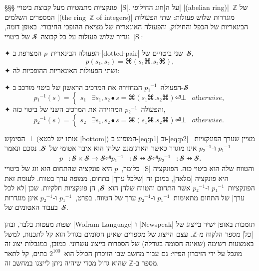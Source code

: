 §§§ פונקציות מתמטיות מעל קבוצת ביטויי~\E|S|.
על ה\ע|חוג החילופי| \E|(abelian ring)|~$ℤ$ של המספרים השלמים \E|(the ring~$ℤ$
of integers)| מוגדרות שלוש פעולות: שתי הפעולות הבינאריות של הכפל והחילוק,
והפעולה האונארית של מציאת ההופכי החיבורי. באופן דומה, נגדיר שלוש פעולות על כל
קבוצה~$𝓢$ של ביטויי~\E|S|:
\begin{enumerate}
  ✦ הפעולה הבינארית~$p$ המצרפת ב-\E|dotted-pair| שני ביטויים של~$𝓢$,
  \begin{equation}
    p(s₁,s₂)=⌘(s₁⌘.s₂⌘),
  \end{equation}
  ✦ ושתי הפעולות האונאריות ההופכיות לה:
  \begin{enumerate}
    ✦ הפעולה~$p₁^{-1}$ המחזירה את המרכיב
    הראשון של ביטוי מורכב ב-$𝓢$
    \begin{equation}\label{eq:p1}
      p₁^{-1}(s)=\begin{cases}
        s₁ & ∃ s₁, s₂ ∙ s=⌘(s₁⌘.s₂⌘) ⏎
        ⊥  & \textit{otherwise},
      \end{cases}
    \end{equation}
    ✦ והפעולה~$p₂^{-1}$ המחזירה את המרכיב השני של ביטוי כזה,
    \begin{equation}\label{eq:p2}
      p₂^{-1}(s)=\begin{cases}
        s₂ & ∃ s₁, s₂ ∙ s=⌘(s₁⌘.s₂⌘) ⏎
        ⊥  & \textit{otherwise}.
      \end{cases}
    \end{equation}
  \end{enumerate}
\end{enumerate}
הסימןש~$⊥$ (אותו יש לבטא \E|bottom|) המופיע ב-|eq:p1| וב-|eq:p2|
מציין שערך הפונקציות~$p₁^{-1}$ ו-$p₂^{-1}$ אינו מוגדר כאשר הארגומנט שלהן הוא
איבר אטומי של~$𝓢$. נסכם ונאמר
\begin{equation}
  \begin{split}
    p&:𝓢×𝓢→𝓢⏎
    p₁^{-1}&:𝓢 ⇸𝓢⏎
    p₂^{-1}&:𝓢 ⇸𝓢.
  \end{split}
\end{equation}
כלומר,~$p$ היא פונקציה שהתחום הוא זוג של ביטויי~\E|S| והטווח שלה הוא ביטוי כזה.
הפונקציה היא פונקציה \ע|מלאה|, במובן זה \ע|שלכל ערך| בתחום, ממופה ערך בטווח.
לעומת זאת הפונקציות~$p₁^{-1}$ ו-$p₂^{-1}$ אשר התחום והטווח שלהן הוא~$𝓢$, הן
פונקציות חלקיות. שכן \ע|לא לכל ערך| של התחום מתאימות~$p₁^{-1}$ ו-$p₂^{-1}$ ערך
של הטווח. בפרט,~$p₁^{-1}$ ו-$p₂^{-1}$ אינן מוגדרות בעבור האטומים של~$𝓢$.

שפות מעטות בלבד, ובהן \E|Wofram Language| ו-\E|Newspeak| תומכות באופן ישיר
בייצוג של \ע|כל| מספר הלקוח מ-$ℤ$. עצם הייצוג של מספרים שאינן חסומים בגודל
הוא קל לתכנות, למשל באמצעות רשימה (שאינה חסומה בגודלה) של הספרות בייצוג עשרוני.
כמובן, במגבלות יצוג זה מוגבל על ידי הזיכרון הפיזי: גם עבור מחשב שבו הזיכרון
הכולל הוא~$2^{100}$ בתים, קל לתאר מספר ב-$ℤ$ שהוא גדול מכדי שיהיה ניתן לייצגו
במחשב זה.

